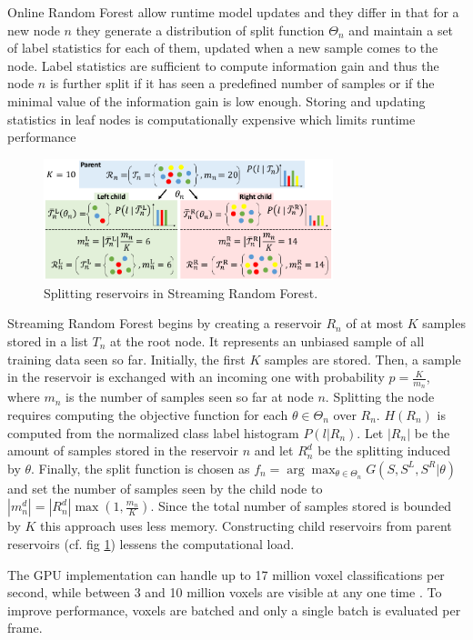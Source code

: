 \documentclass{llncs}
\begin{document}
  Online Random Forest \cite{online_forest} allow runtime model updates and they differ in that for a new node $n$ they generate a distribution of split function $\Theta_n$ and maintain a set of label statistics for each of them, updated when a new sample comes to the node. Label statistics are sufficient to compute information gain and thus the node $n$ is further split if it has seen a predefined number of samples or if the minimal value of the information gain is low enough. Storing and updating statistics in leaf nodes is computationally expensive which limits runtime performance
  
\begin{figure}[!ht]
  \center
  \includegraphics[width=0.75\textwidth]{figures/forest}
  \caption{Splitting reservoirs in Streaming Random Forest.}
  \label{fig:forest}
\end{figure}
  
  Streaming Random Forest begins by creating a reservoir $R_n$ of at most $K$ samples stored in a list $T_n$ at the root node. It represents an unbiased sample of all training data seen so far. Initially, the first $K$ samples are stored. Then, a sample in the reservoir is exchanged with an incoming one with probability $p = \frac{K}{m_n}$, where $m_n$ is the number of samples seen so far at node $n$. Splitting the node requires computing the objective function for each $\theta \in \Theta_n$ over $R_n$. $H(R_n)$ is computed from the normalized class label histogram $P(l|R_n)$. Let $|R_n|$ be the amount of samples stored in the reservoir $n$ and let $R_n^d$ be the splitting induced by $\theta$. Finally, the split function is chosen as $f_n = \arg \max_{\theta \in \Theta_n} G(S, S^L, S^R | \theta)$  and set the number of samples seen by the child node to $|m_n^d| = |R_n^d| \max {\left(1, \frac{m_n}{K}\right)}$. Since the total number of samples stored is bounded by $K$ this approach uses less memory. Constructing child reservoirs from parent reservoirs (cf. fig \ref{fig:forest}) lessens the computational load.
  
  The GPU implementation can handle up to 17 million voxel classifications per second, while between 3 and 10 million voxels are visible at any one time \cite{hashed_voxel}. To improve performance, voxels are batched and only a single batch is evaluated per frame.
\end{document}

